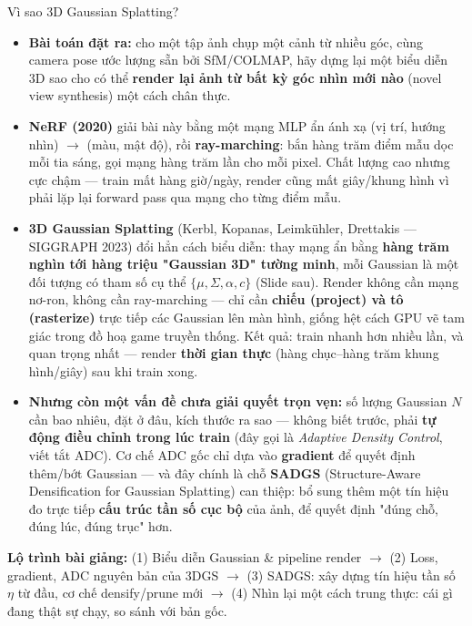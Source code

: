 
\begin{frame}
\titlepage
\end{frame}

\begin{frame}{Vì sao 3D Gaussian Splatting?}
\footnotesize
\begin{itemize}
    \item \textbf{Bài toán đặt ra:} cho một tập ảnh chụp một cảnh từ nhiều góc, cùng camera pose ước lượng sẵn bởi
    SfM/COLMAP, hãy dựng lại một biểu diễn 3D sao cho có thể \textbf{render lại ảnh từ bất kỳ góc nhìn mới nào}
    (novel view synthesis) một cách chân thực.
    \item \textbf{NeRF (2020)} giải bài này bằng một mạng MLP ẩn ánh xạ (vị trí, hướng nhìn) $\to$ (màu, mật độ), rồi
    \textbf{ray-marching}: bắn hàng trăm điểm mẫu dọc mỗi tia sáng, gọi mạng hàng trăm lần cho mỗi pixel. Chất lượng
    cao nhưng cực chậm --- train mất hàng giờ/ngày, render cũng mất giây/khung hình vì phải lặp lại forward pass qua mạng cho từng điểm mẫu.
    \item \textbf{3D Gaussian Splatting} (Kerbl, Kopanas, Leimkühler, Drettakis --- SIGGRAPH 2023) đổi hẳn cách biểu diễn:
    thay mạng ẩn bằng \textbf{hàng trăm nghìn tới hàng triệu "Gaussian 3D" tường minh}, mỗi Gaussian là một đối tượng
    có tham số cụ thể $\{\mu,\Sigma,\alpha,c\}$ (Slide sau). Render không cần mạng nơ-ron, không cần ray-marching --- chỉ
    cần \textbf{chiếu (project) và tô (rasterize)} trực tiếp các Gaussian lên màn hình, giống hệt cách GPU vẽ tam giác
    trong đồ hoạ game truyền thống. Kết quả: train nhanh hơn nhiều lần, và quan trọng nhất --- render \textbf{thời gian thực}
    (hàng chục--hàng trăm khung hình/giây) sau khi train xong.
    \item \textbf{Nhưng còn một vấn đề chưa giải quyết trọn vẹn:} số lượng Gaussian $N$ cần bao nhiêu, đặt ở đâu, kích
    thước ra sao --- không biết trước, phải \textbf{tự động điều chỉnh trong lúc train} (đây gọi là \emph{Adaptive Density
    Control}, viết tắt ADC). Cơ chế ADC gốc chỉ dựa vào \textbf{gradient} để quyết định thêm/bớt Gaussian --- và đây
    chính là chỗ \textbf{SADGS} (Structure-Aware Densification for Gaussian Splatting) can thiệp: bổ sung thêm một tín
    hiệu đo trực tiếp \textbf{cấu trúc tần số cục bộ} của ảnh, để quyết định "đúng chỗ, đúng lúc, đúng trục" hơn.
\end{itemize}
\vspace{2pt}
\footnotesize\textbf{Lộ trình bài giảng:} (1) Biểu diễn Gaussian \& pipeline render $\to$ (2) Loss, gradient, ADC nguyên
bản của 3DGS $\to$ (3) SADGS: xây dựng tín hiệu tần số $\eta$ từ đầu, cơ chế densify/prune mới $\to$ (4) Nhìn lại một
cách trung thực: cái gì đang thật sự chạy, so sánh với bản gốc.
\end{frame}

